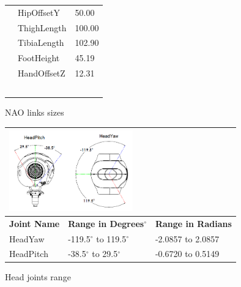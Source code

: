 \begin{figure}
\begin{tabular}{p{9cm}l|l|}
{}& \multicolumn{1}{|l|}{HipOffsetY} & 50.00 \\ \cline{2-3}
& \multicolumn{1}{|l|}{ThighLength} & 100.00 \\ \cline{2-3}
& \multicolumn{1}{|l|}{TibiaLength} & 102.90 \\ \cline{2-3}
& \multicolumn{1}{|l|}{FootHeight} & 45.19 \\ \cline{2-3}
& \multicolumn{1}{|l|}{HandOffsetZ} & 12.31 \\\cline{2-3}
& \multicolumn{2}{c}{} \\
& \multicolumn{2}{c}{} \\
& \multicolumn{2}{c}{} \\
& \multicolumn{2}{c}{} \\
& \multicolumn{2}{c}{} \\

\end{tabular}
\caption{NAO links sizes}
\label{fig:NAOlinks}
\end{figure}

\begin{figure}
\begin{tabular}{|p{5cm}|p{5cm}|p{5cm}|}
\multicolumn{3}{p{15cm}}{\centering \includegraphics[height = 3.5cm]{Figures/headjoints.png}} \\ \hline
\textbf{Joint Name} & \textbf{Range in Degrees$^{\circ}$} & \textbf{Range in Radians} \\ \hline
HeadYaw & -119.5$^{\circ}$ to 119.5$^{\circ}$ & -2.0857 to 2.0857 \\ \hline
HeadPitch & -38.5$^{\circ}$ to 29.5$^{\circ}$ & -0.6720 to 0.5149 \\ \hline
\end{tabular}
\caption{Head joints range}
\label{fig:hjoints}
\end{figure}

